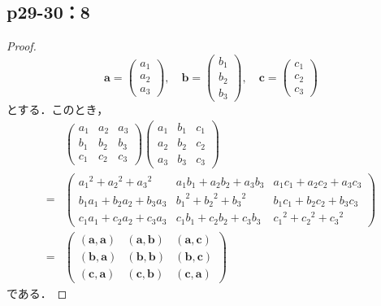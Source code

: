 \documentclass[uplatex,dvipdfmx,a4paper,10pt,fleqn]{jsarticle}
\begin{document}
\subsection*{p29-30：8}
\begin{tleftbar}
    \begin{proof}
    \[
    \bm{a}=\begin{pmatrix} a_1 \\ a_2 \\ a_3 \end{pmatrix},\quad \bm{b}=\begin{pmatrix} b_1 \\ b_2 \\ b_3 \end{pmatrix},\quad \bm{c}=\begin{pmatrix} c_1 \\ c_2 \\ c_3 \end{pmatrix}
    \]
    とする．このとき，
    \begin{align*}
        &
        \begin{pmatrix}
            a_1 & a_2 & a_3 \\
            b_1 & b_2 & b_3 \\
            c_1 & c_2 & c_3
        \end{pmatrix}
        \begin{pmatrix}
            a_1 & b_1 & c_1 \\
            a_2 & b_2 & c_2 \\
            a_3 & b_3 & c_3
        \end{pmatrix}
        \\
         =& \begin{pmatrix}
            {a_1}^2 +{a_2}^2 +{a_3}^2 & a_1 b_1 + a_2 b_2 + a_3 b_3 & a_1 c_1 + a_2 c_2 + a_3 c_3 \\
            b_1 a_1 + b_2 a_2 + b_3 a_3 & {b_1}^2 +{b_2}^2 + {b_3}^2 & b_1 c_1 + b_2 c_2 + b_3 c_3 \\
            c_1 a_1 + c_2 a_2 + c_3 a_3 & c_1 b_1 + c_2 b_2 + c_3 b_3 & {c_1}^2 +{c_2}^2 +{c_3}^2
        \end{pmatrix}
        \\
        =& \begin{pmatrix}
            (\bm{a},\bm{a}) & (\bm{a},\bm{b}) & (\bm{a},\bm{c}) \\
            (\bm{b},\bm{a}) & (\bm{b},\bm{b}) & (\bm{b},\bm{c}) \\
            (\bm{c},\bm{a}) & (\bm{c},\bm{b}) & (\bm{c},\bm{a})
        \end{pmatrix}
    \end{align*}
    である．


\end{proof}
\end{tleftbar}
\end{document}
